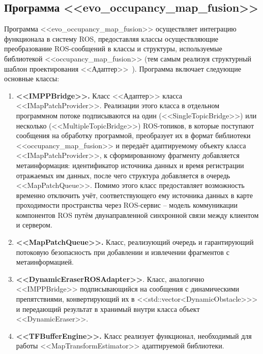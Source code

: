 \subsection{Программа <<evo\_occupancy\_map\_fusion>>}

Программа <<evo\_occupancy\_map\_fusion>> осуществляет интеграцию функционала в систему ROS, предоставляя классы осуществляющие преобразование ROS-сообщений в классы и структуры, используемые библиотекой <<occupancy\_map\_fusion>> (тем самым реализуя структурный шаблон проектирования <<Адаптер>>~\cite{freeman2004head}). Программа включает следующие основные классы:

\begin{enumerate}
	\item \textbf{<<IMPPBridge>>.} Класс <<Адаптер>> класса <<IMapPatchProvider>>. Реализации этого класса в отдельном программном потоке подписываются на один (<<SingleTopicBridge>>) или несколько (<<MultipleTopicBridge>>) ROS-топиков, в которые поступают сообщения на обработку программой, преобразует их в формат библиотеки <<occupancy\_map\_fusion>> и передаёт адаптируемому объекту класса <<IMapPatchProvider>>, к сформированному фрагменту добавляется метаинформация: идентификатор источника данных и время регистрации отражаемых им данных, после чего структура добавляется в очередь <<MapPatchQueue>>. Помимо этого класс предоставляет возможность временно отключить учёт, соответствующего ему источника данных в карте проходимости пространства через ROS-сервис -- модель коммуникации компонентов ROS путём двунаправленной синхронной связи между клиентом и сервером.
	
	\item \textbf{<<MapPatchQueue>>.} Класс, реализующий очередь и гарантирующий потоковую безопасность при добавлении и извлечении фрагментов с метаинформацией.
	
	\item \textbf{<<DynamicEraserROSAdapter>>}. Класс, аналогично <<IMPPBridge>> подписывающийся на сообщения с динамическими препятствиями, конвертирующий их в <<std::vector<DynamicObstacle>>> и передающий результат в хранимый внутри класса объект <<DynamicEraser>>.
	
	\item \textbf{<<TFBufferEngine>>.} Класс реализует функционал, необходимый для работы <<MapTransformEstimator>> адаптируемой библиотеки. 
	

\end{enumerate}
